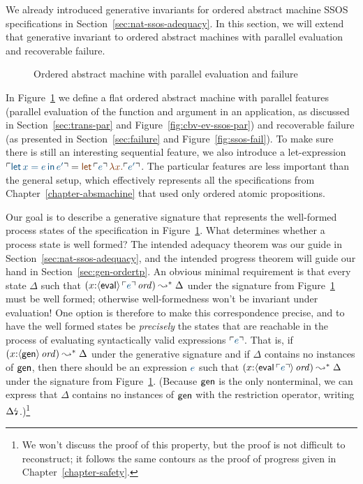 We already introduced generative invariants for ordered
abstract machine SSOS specifications in
Section~\ref{sec:nat-ssos-adequacy}. In this section, we will extend 
that generative invariant to ordered abstract machines
with parallel evaluation and recoverable failure.


\begin{figure}[t]
\caption{Ordered abstract machine with parallel evaluation and failure}
\label{fig:gen-order-prog}
\end{figure}

In Figure~\ref{fig:gen-order-prog} we define a flat ordered abstract
machine with parallel features (parallel evaluation of the function
and argument in an application, as discussed in
Section~\ref{sec:trans-par} and Figure~\ref{fig:cbv-ev-ssos-par}) and
recoverable failure (as presented in Section~\ref{sec:failure} and
Figure~\ref{fig:ssos-fail}). To make sure there is still an
interesting sequential feature, we also introduce a let-expression
$\interp{{\sf let}\,x = e\,{\sf in}\,e'} = \lf{{\sf
    let}\,\interp{e}\,\lambda x.\interp{e'}}$. The particular features
are less important than the general setup, which effectively
represents all the specifications from
Chapter~\ref{chapter-absmachine} that used only ordered atomic
propositions. %


Our goal is to describe a generative signature that represents the
well-formed process states of the specification in
Figure~\ref{fig:gen-order-prog}. What determines whether a process
state is well formed? The intended adequacy theorem was our guide in
Section~\ref{sec:nat-ssos-adequacy}, and the intended progress theorem
will guide our hand in Section~\ref{sec:gen-ordertp}. An obvious
minimal requirement is that every state $\Delta$ such that
$(x{:}\istrue{\susp{\sf eval}\,\interp{e}}) \leadsto^* \Delta$ under
the signature from Figure~\ref{fig:gen-order-prog} must be well
formed; otherwise well-formedness won't be invariant under evaluation!
One option is therefore to make this correspondence precise, and to
have the well formed states be {\it precisely} the states that are
reachable in the process of evaluating syntactically valid expressions
$\interp{e}$. That is, if $(x{:}{\langle {\sf gen} \rangle}\,{{\it ord}}) \leadsto^*
\Delta$ under the generative signature and if $\Delta$ contains no
instances of ${\sf gen}$, then there should be an expression $\obj{e}$
such that $(x{:}\istrue{\susp{{\sf eval}\,\interp{e}}}) \leadsto^*
\Delta$ under the signature from
Figure~\ref{fig:gen-order-prog}. (Because ${\sf gen}$ is the only
nonterminal, we can express that $\Delta$ contains no instances of
${\sf gen}$ with the restriction operator, writing
${\Delta}{\mbox{\lightning}}_{}$.)\footnote{We won't discuss the proof of this
  property, but the proof is not difficult to reconstruct; it follows
  the same contours as the proof of progress given in
  Chapter~\ref{chapter-safety}.}

